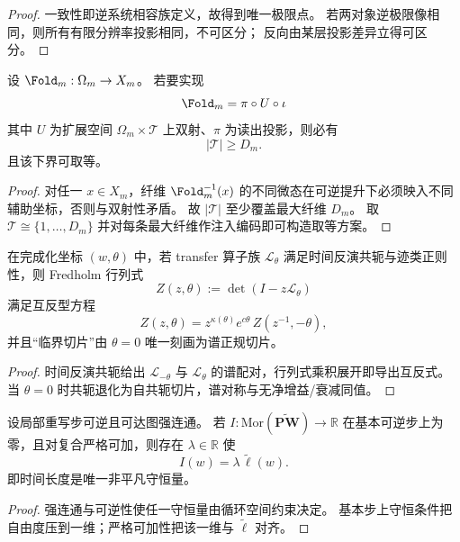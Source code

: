 \begin{proof}
一致性即逆系统相容族定义，故得到唯一极限点。
若两对象逆极限像相同，则所有有限分辨率投影相同，不可区分；
反向由某层投影差异立得可区分。
\end{proof}

\begin{theorem}[时间纤维最小维数定理]\label{thm:xi-time-fiber-minimal-dimension}
设 \(\Fold_m:\Omega_m\to X_m\)。
若要实现
\[
\Fold_m=\pi\circ U\circ\iota
\]
其中 \(U\) 为扩展空间 \(\Omega_m\times\mathcal T\) 上双射、\(\pi\) 为读出投影，则必有
\[
|\mathcal T|\ge D_m.
\]
且该下界可取等。
\end{theorem}

\begin{proof}
对任一 \(x\in X_m\)，纤维 \(\Fold_m^{-1}(x)\) 的不同微态在可逆提升下必须映入不同辅助坐标，否则与双射性矛盾。
故 \(|\mathcal T|\) 至少覆盖最大纤维 \(D_m\)。
取 \(\mathcal T\cong\{1,\dots,D_m\}\) 并对每条最大纤维作注入编码即可构造取等方案。
\end{proof}

\begin{proposition}[时间反演参数化下的谱互反律]\label{prop:xi-time-reversal-spectral-reciprocity}
在完成化坐标 \((w,\theta)\) 中，若 transfer 算子族 \(\mathcal L_\theta\) 满足时间反演共轭与迹类正则性，则 Fredholm 行列式
\[
Z(z,\theta):=\det(I-z\mathcal L_\theta)
\]
满足互反型方程
\[
Z(z,\theta)=z^{\kappa(\theta)}e^{c\theta}\,Z(z^{-1},-\theta),
\]
并且“临界切片”由 \(\theta=0\) 唯一刻画为谱正规切片。
\end{proposition}

\begin{proof}
时间反演共轭给出 \(\mathcal L_{-\theta}\) 与 \(\mathcal L_\theta\) 的谱配对，行列式乘积展开即导出互反式。
当 \(\theta=0\) 时共轭退化为自共轭切片，谱对称与无净增益/衰减同值。
\end{proof}

\begin{theorem}[微可逆且不可约时的守恒量退化]\label{thm:xi-time-only-conserved-quantity}
设局部重写步可逆且可达图强连通。
若 \(I:\mathrm{Mor}(\widetilde{\mathbf{PW}})\to\mathbb R\) 在基本可逆步上为零，且对复合严格可加，则存在 \(\lambda\in\mathbb R\) 使
\[
I(w)=\lambda\,\widetilde\ell(w).
\]
即时间长度是唯一非平凡守恒量。
\end{theorem}

\begin{proof}
强连通与可逆性使任一守恒量由循环空间约束决定。
基本步上守恒条件把自由度压到一维；严格可加性把该一维与 \(\widetilde\ell\) 对齐。
\end{proof}

